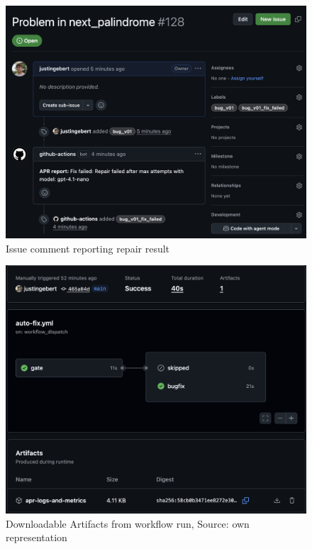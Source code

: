 \begin{figure}[H]
    \centering
    \includegraphics[width=1\textwidth]{images/verification/comment.png}
    \caption{Issue comment reporting repair result}
    \label{fig:comment}
\end{figure}

\begin{figure}[H]
    \centering
    \includegraphics[width=1\textwidth]{images/verification/artifacts.png}
    \caption{Downloadable Artifacts from workflow run, Source: own representation}
    \label{fig:logs-artifacts}
\end{figure}

